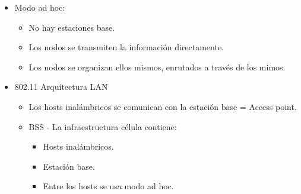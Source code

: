 \documentclass[12pt, twoside, openright]{report} %
\begin{document}
\begin{itemize}
\item Modo ad hoc:
\begin{itemize}
  \item No hay estaciones base.
  \item Los nodos se transmiten la información directamente.
  \item Los nodos se organizan ellos mismos, enrutados a través de los mimos.
\end{itemize}
     
\item 802.11 Arquitectura LAN
\begin{itemize}
  \item Los hosts inalámbricos se comunican con la estación base = Access point.
  \item BSS - La infraestructura célula contiene:
  \begin{itemize}
    \item Hosts inalámbricos.
    \item Estación base.
    \item Entre los hosts se usa modo ad hoc.
  \end{itemize}
     

\end{itemize}
\end{itemize}
\end{document}
